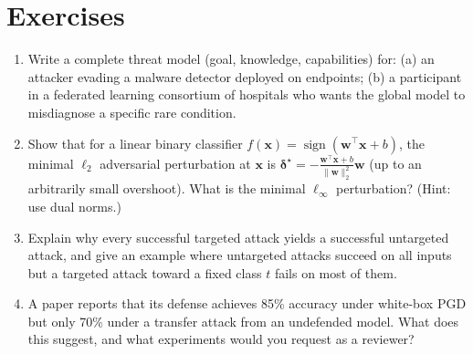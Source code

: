\documentclass[10pt,a4paper]{extarticle}
\theoremstyle{definition}
\newcommand{\x}{\mathbf{x}}
\newcommand{\bdelta}{\boldsymbol{\delta}}
\DeclareMathOperator{\sign}{sign}
\begin{document}
\section*{Exercises}

\begin{enumerate}[label=\textbf{\arabic*.}]
  \item Write a complete threat model (goal, knowledge, capabilities) for: (a) an attacker evading a malware detector deployed on endpoints; (b) a participant in a federated learning consortium of hospitals who wants the global model to misdiagnose a specific rare condition.
  \item Show that for a linear binary classifier \(f(\x) = \sign(\mathbf{w}^\top \x + b)\), the minimal \(\ell_2\) adversarial perturbation at \(\x\) is \(\bdelta^\star = -\frac{\mathbf{w}^\top \x + b}{\|\mathbf{w}\|_2^2}\mathbf{w}\) (up to an arbitrarily small overshoot). What is the minimal \(\ell_\infty\) perturbation? (Hint: use dual norms.)
  \item Explain why every successful targeted attack yields a successful untargeted attack, and give an example where untargeted attacks succeed on all inputs but a targeted attack toward a fixed class \(t\) fails on most of them.
  \item A paper reports that its defense achieves 85\% accuracy under white-box PGD but only 70\% under a transfer attack from an undefended model. What does this suggest, and what experiments would you request as a reviewer?
\end{enumerate}



\end{document}
